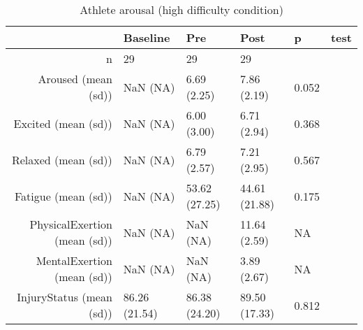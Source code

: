 \begin{table}[ht]
\centering
\begin{tabular}{rlllll}
  \hline
 & Baseline & Pre & Post & p & test \\ 
  \hline
n &    29 &    29 &    29 &  &  \\ 
  Aroused (mean (sd)) &   NaN (NA) &  6.69 (2.25) &  7.86 (2.19) &  0.052 &  \\ 
  Excited (mean (sd)) &   NaN (NA) &  6.00 (3.00) &  6.71 (2.94) &  0.368 &  \\ 
  Relaxed (mean (sd)) &   NaN (NA) &  6.79 (2.57) &  7.21 (2.95) &  0.567 &  \\ 
  Fatigue (mean (sd)) &   NaN (NA) & 53.62 (27.25) & 44.61 (21.88) &  0.175 &  \\ 
  PhysicalExertion (mean (sd)) &   NaN (NA) &   NaN (NA) & 11.64 (2.59) &  NA &  \\ 
  MentalExertion (mean (sd)) &   NaN (NA) &   NaN (NA) &  3.89 (2.67) &  NA &  \\ 
  InjuryStatus (mean (sd)) & 86.26 (21.54) & 86.38 (24.20) & 89.50 (17.33) &  0.812 &  \\ 
   \hline
\end{tabular}
\caption{Athlete arousal 
 (high difficulty condition)} 
\end{table}
